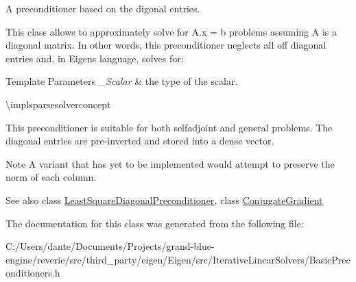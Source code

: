 A preconditioner based on the digonal entries. 

This class allows to approximately solve for A.\+x = b problems assuming A is a diagonal matrix. In other words, this preconditioner neglects all off diagonal entries and, in Eigen\textquotesingle{}s language, solves for\+: 
\begin{DoxyCode}{0}
\end{DoxyCode}



\begin{DoxyTemplParams}{Template Parameters}
{\em \+\_\+\+Scalar} & the type of the scalar.\\
\hline
\end{DoxyTemplParams}
\textbackslash{}implsparsesolverconcept

This preconditioner is suitable for both selfadjoint and general problems. The diagonal entries are pre-\/inverted and stored into a dense vector.

\begin{DoxyNote}{Note}
A variant that has yet to be implemented would attempt to preserve the norm of each column.
\end{DoxyNote}
\begin{DoxySeeAlso}{See also}
class \mbox{\hyperlink{class_eigen_1_1_least_square_diagonal_preconditioner}{Least\+Square\+Diagonal\+Preconditioner}}, class \mbox{\hyperlink{class_eigen_1_1_conjugate_gradient}{Conjugate\+Gradient}} 
\end{DoxySeeAlso}


The documentation for this class was generated from the following file\+:\begin{DoxyCompactItemize}
\item 
C\+:/\+Users/dante/\+Documents/\+Projects/grand-\/blue-\/engine/reverie/src/third\+\_\+party/eigen/\+Eigen/src/\+Iterative\+Linear\+Solvers/Basic\+Preconditioners.\+h\end{DoxyCompactItemize}
